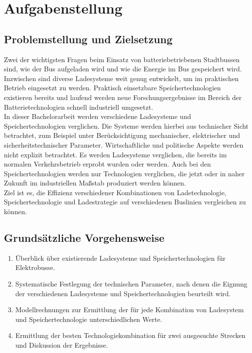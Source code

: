 \chapter*{Aufgabenstellung}

\section*{Problemstellung und Zielsetzung}
Zwei der wichtigsten Fragen beim Einsatz von batteriebetriebenen Stadtbussen sind, wie der Bus aufgeladen wird und wie die Energie im Bus gespeichert wird. Inzwischen sind diverse Ladesysteme weit genug entwickelt, um im praktischen Betrieb eingesetzt zu werden. Praktisch einsetzbare Speichertechnologien existieren bereits und laufend werden neue Forschungsergebnisse im Bereich der Batterietechnologien schnell industriell umgesetzt.\\
In dieser Bachelorarbeit werden verschiedene Ladesysteme und Speichertechnologien verglichen. Die Systeme werden hierbei aus technischer Sicht betrachtet, zum Beispiel unter Berücksichtigung mechanischer, elektrischer und sicherheitstechnischer Parameter. Wirtschaftliche und politische Aspekte werden nicht explizit betrachtet. Es werden Ladesysteme verglichen, die bereits im normalen Verkehrsbetrieb erprobt wurden oder werden. Auch bei den Speichertechnologien werden nur Technologien verglichen, die jetzt oder in naher Zukunft im industriellen Maßstab produziert werden können.\\
Ziel ist es, die Effizienz verschiedener Kombinationen von Ladetechnologie, Speichertechnologie und Ladestrategie auf verschiedenen Buslinien vergleichen zu können.

\section*{Grundsätzliche Vorgehensweise}
\begin{enumerate}
	\item Überblick über existierende Ladesysteme und Speichertechnologien für Elektrobusse.
	\item Systematische Festlegung der technischen Parameter, nach denen die Eignung der verschiedenen Ladesysteme und Speichertechnologien beurteilt wird.
	\item Modellrechnungen zur Ermittlung der für jede Kombination von Ladesystem und Speichertechnologie unterschiedlichen Werte.
	\item Ermittlung der besten Technologiekombination für zwei ausgesuchte Strecken und Diskussion der Ergebnisse.
\end{enumerate}